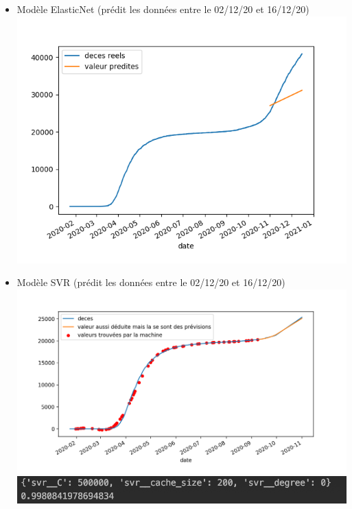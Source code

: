 \documentclass[a4paper,11pt]{article}
\begin{document}
	\begin{itemize}
		\item Modèle ElasticNet (prédit les données entre le 02/12/20 et 16/12/20)\\
		\includegraphics[scale=1]{Figure_EN}\\

		\item Modèle SVR (prédit les données entre le 02/12/20 et 16/12/20)\\
		\includegraphics[scale=0.7]{Figure_SVR}\\
		\includegraphics[scale=1]{params}\\
		

\end{itemize}
\end{document}
